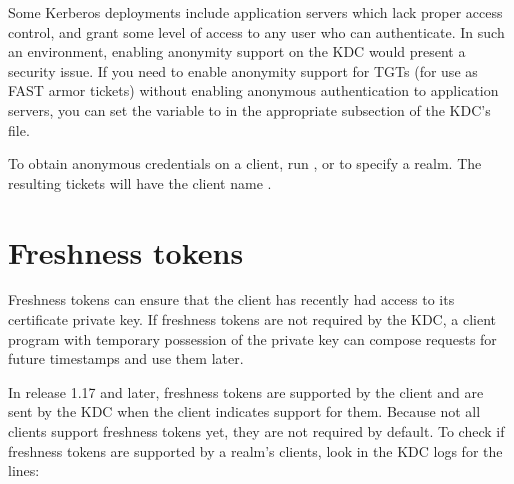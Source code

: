 \documentclass[letterpaper,10pt,english]{sphinxmanual}
\begin{document}
Some Kerberos deployments include application servers which lack
proper access control, and grant some level of access to any user who
can authenticate.  In such an environment, enabling anonymity support
on the KDC would present a security issue.  If you need to enable
anonymity support for TGTs (for use as FAST armor tickets) without
enabling anonymous authentication to application servers, you can set
the variable  to  in the
appropriate {\hyperref[\detokenize{admin/conf_files/kdc_conf:kdc-realms}]{}} subsection of the KDC’s
{\hyperref[\detokenize{admin/conf_files/kdc_conf:kdc-conf-5}]{}} file.

To obtain anonymous credentials on a client, run , or
 to specify a realm.  The resulting tickets
will have the client name .


\section{Freshness tokens}
\label{\detokenize{admin/pkinit:freshness-tokens}}
Freshness tokens can ensure that the client has recently had access to
its certificate private key.  If freshness tokens are not required by
the KDC, a client program with temporary possession of the private key
can compose requests for future timestamps and use them later.

In release 1.17 and later, freshness tokens are supported by the
client and are sent by the KDC when the client indicates support for
them.  Because not all clients support freshness tokens yet, they are
not required by default.  To check if freshness tokens are supported
by a realm’s clients, look in the KDC logs for the lines:

%
\begin{sphinxVerbatim}[commandchars=\\\{\}]
      
       
\end{sphinxVerbatim}
\end{document}
